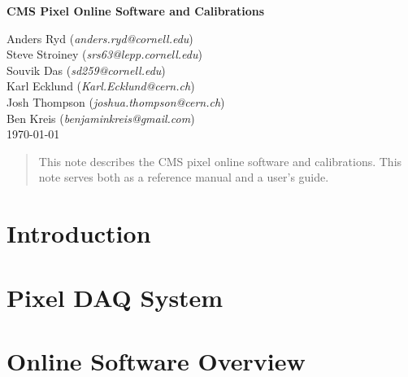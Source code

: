 \documentclass[12pt]{article}
\begin{document}

\begin{center}
{\Large{\bf CMS Pixel Online Software and Calibrations}}
\end{center}
\begin{center}
\vskip 0.5cm
Anders Ryd ({\it anders.ryd@cornell.edu})\\
Steve Stroiney ({\it srs63@lepp.cornell.edu})\\
Souvik Das ({\it sd259@cornell.edu}) \\
Karl Ecklund ({\it Karl.Ecklund@cern.ch})\\
Josh Thompson ({\it joshua.thompson@cern.ch}) \\
Ben Kreis ({\it benjaminkreis@gmail.com})\\
\today \\
\end{center}


\begin{abstract}
This note describes the CMS pixel online software and
calibrations. This note serves both as a reference manual
and a user's guide. 

\end{abstract}

\newpage

\tableofcontents

\newpage

\section{Introduction}


\section{Pixel DAQ System}


\section{Online Software Overview}
\label{sect:overview}

\end{document}
